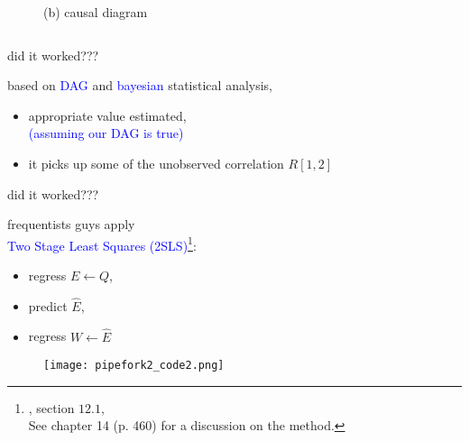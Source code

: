 \begin{frame}
\begin{columns}
\begin{column}{0.5\textwidth}
\begin{figure}
				\caption*{(b) causal diagram}
			\end{figure}
		\end{column}
	\end{columns}
\end{frame}
%
%
\begin{lhframe}[rhgraphic={\texttt{[image: pipefork2\_reg3.png]}}]
	{did it worked???}
	
	based on \textcolor{blue}{DAG} and \textcolor{blue}{bayesian} statistical analysis,
	\begin{itemize}
		\item appropriate value estimated, \\
		{\small \textcolor{blue}{(assuming our DAG is true)} }
		\item it picks up some of the unobserved correlation $R[1,2]$
	\end{itemize}
\end{lhframe}
%
%
\begin{lhframe}[rhgraphic={\texttt{[image: pipefork2\_reg4.png]}}]
	{did it worked???}
	
	frequentists guys apply \\
	\textcolor{blue}{Two Stage Least Squares (2SLS)}\footnote{\citet{Hanck_et_al_2021}, section $12.1$, \\
		See \citet{McElreath_2020} chapter 14 (p. 460) for a discussion on the method.}:
	\begin{itemize}
		\item regress $E \leftarrow Q$, 
		\item predict $\hat{E}$,
		\item regress $W \leftarrow \hat{E}$
	\end{itemize}
	\begin{figure}
		\texttt{[image: pipefork2\_code2.png]}
	\end{figure}
\end{lhframe}
